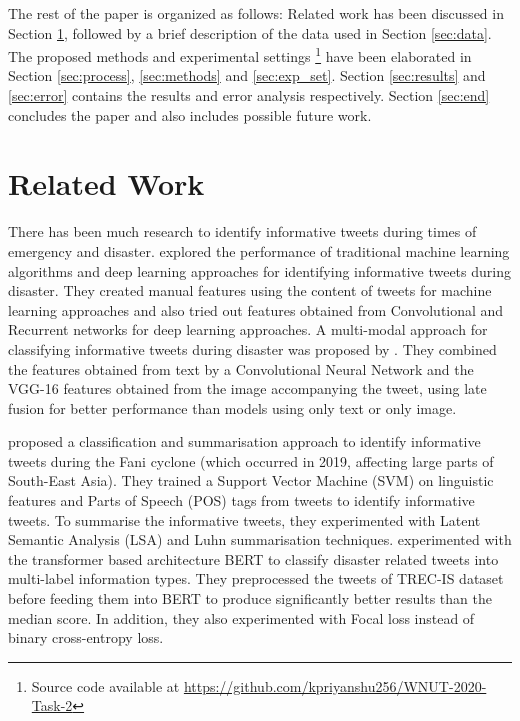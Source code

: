 \documentclass[11pt,a4paper]{article}
\begin{document}
The rest of the paper is organized as follows: Related work has been discussed in Section \ref{sec:relwork}, followed by a brief description of the data used in Section \ref{sec:data}. The proposed methods and experimental settings \footnote{Source code available at \url{https://github.com/kpriyanshu256/WNUT-2020-Task-2}} have been elaborated in Section \ref{sec:process}, \ref{sec:methods}  and \ref{sec:exp_set}. Section \ref{sec:results} and \ref{sec:error} contains the results and error analysis respectively. Section \ref{sec:end} concludes the paper and also includes possible future work.


\section{Related Work}
\label{sec:relwork}

There has been much research to identify informative tweets during times of emergency and disaster. \citet{neppalli2018deep} explored the performance of traditional machine learning algorithms and deep learning approaches for identifying informative tweets during disaster. They created manual features using the content of tweets for machine learning approaches and also tried out features obtained from Convolutional and Recurrent networks for deep learning approaches. A multi-modal approach for classifying informative tweets during disaster was proposed by \citet{madichetty2020classifying}. They combined the features obtained from text by a Convolutional Neural Network and the VGG-16 features obtained from the image accompanying the tweet, using late fusion for better performance than models using only text or only image.

\citet{roy2020classification} proposed a classification and summarisation approach to identify informative tweets during the Fani cyclone (which occurred in 2019, affecting large parts of South-East Asia). They trained a Support Vector Machine (SVM) on linguistic features and Parts of Speech (POS) tags from tweets to identify informative tweets. To summarise the informative tweets, they experimented with Latent Semantic Analysis (LSA) and Luhn summarisation techniques. \citet{zahera2019fine} experimented with the transformer based architecture BERT to classify disaster related tweets into multi-label information types. They preprocessed the tweets of TREC-IS dataset before feeding them into BERT to produce significantly better results than the median score. In addition, they also experimented with Focal loss instead of binary cross-entropy loss.
\end{document}
